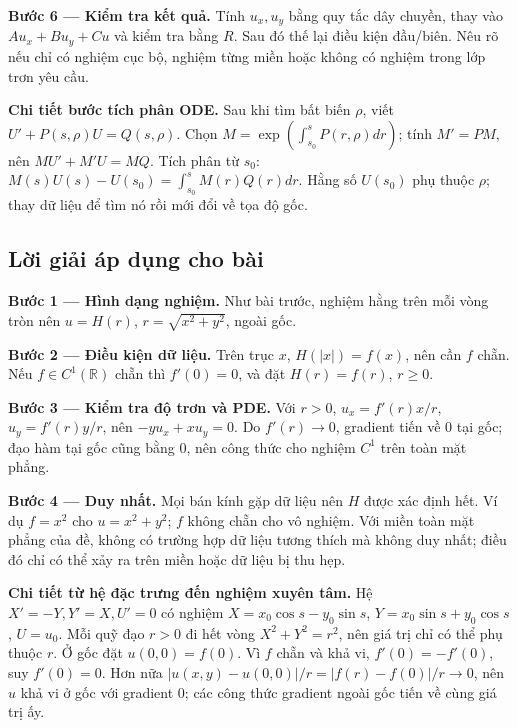\documentclass[10pt,a4paper]{article}
\begin{document}
\textbf{Bước 6 — Kiểm tra kết quả.} Tính $u_x,u_y$ bằng quy tắc dây chuyền, thay vào $Au_x+Bu_y+Cu$ và kiểm tra bằng $R$. Sau đó thế lại điều kiện đầu/biên. Nêu rõ nếu chỉ có nghiệm cục bộ, nghiệm từng miền hoặc không có nghiệm trong lớp trơn yêu cầu.

\textbf{Chi tiết bước tích phân ODE.} Sau khi tìm bất biến $\rho$, viết $U'+P(s,\rho)U=Q(s,\rho)$. Chọn $M=\exp(\int_{s_0}^{s}P(r,\rho)dr)$; tính $M'=PM$, nên $MU'+M'U=MQ$. Tích phân từ $s_0$: $M(s)U(s)-U(s_0)=\int_{s_0}^sM(r)Q(r)dr$. Hằng số $U(s_0)$ phụ thuộc $\rho$; thay dữ liệu để tìm nó rồi mới đổi về tọa độ gốc.
\subsection*{Lời giải áp dụng cho bài}
\textbf{Bước 1 — Hình dạng nghiệm.} Như bài trước, nghiệm hằng trên mỗi vòng tròn nên $u=H(r)$, $r=\sqrt{x^2+y^2}$, ngoài gốc.

\textbf{Bước 2 — Điều kiện dữ liệu.} Trên trục $x$, $H(|x|)=f(x)$, nên cần $f$ chẵn. Nếu $f\in C^1(\mathbb R)$ chẵn thì $f'(0)=0$, và đặt $H(r)=f(r)$, $r\ge0$.

\textbf{Bước 3 — Kiểm tra độ trơn và PDE.} Với $r>0$, $u_x=f'(r)x/r$, $u_y=f'(r)y/r$, nên $-yu_x+xu_y=0$. Do $f'(r)\to0$, gradient tiến về 0 tại gốc; đạo hàm tại gốc cũng bằng 0, nên công thức cho nghiệm $C^1$ trên toàn mặt phẳng.

\textbf{Bước 4 — Duy nhất.} Mọi bán kính gặp dữ liệu nên $H$ được xác định hết. Ví dụ $f=x^2$ cho $u=x^2+y^2$; $f$ không chẵn cho vô nghiệm. Với miền toàn mặt phẳng của đề, không có trường hợp dữ liệu tương thích mà không duy nhất; điều đó chỉ có thể xảy ra trên miền hoặc dữ liệu bị thu hẹp.

\textbf{Chi tiết từ hệ đặc trưng đến nghiệm xuyên tâm.} Hệ $X'=-Y,Y'=X,U'=0$ có nghiệm $X=x_0\cos s-y_0\sin s$, $Y=x_0\sin s+y_0\cos s$, $U=u_0$. Mỗi quỹ đạo $r>0$ đi hết vòng $X^2+Y^2=r^2$, nên giá trị chỉ có thể phụ thuộc $r$. Ở gốc đặt $u(0,0)=f(0)$. Vì $f$ chẵn và khả vi, $f'(0)=-f'(0)$, suy $f'(0)=0$. Hơn nữa $|u(x,y)-u(0,0)|/r=|f(r)-f(0)|/r\to0$, nên $u$ khả vi ở gốc với gradient $0$; các công thức gradient ngoài gốc tiến về cùng giá trị ấy.
\end{document}
